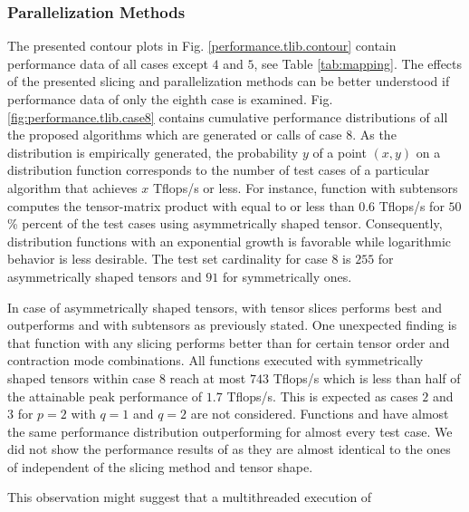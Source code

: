 \subsubsection{Parallelization Methods}
The presented contour plots in Fig. \ref{performance.tlib.contour} contain performance data of all cases except $4$ and $5$, see Table \ref{tab:mapping}.
The effects of the presented slicing and parallelization methods can be better understood if performance data of only the eighth case is examined.
Fig. \ref{fig:performance.tlib.case8} contains cumulative performance distributions of all the proposed algorithms which are generated  or  calls of case 8.
As the distribution is empirically generated, the probability $y$ of a point $(x,y)$ on a distribution function corresponds to the number of test cases of a particular algorithm that achieves $x$ Tflops/s or less.
For instance, function  with subtensors computes the tensor-matrix product with equal to or less than 0.6 Tflops/s for $50$\% percent of the test cases using asymmetrically shaped tensor.
Consequently, distribution functions with an exponential growth is favorable while logarithmic behavior is less desirable.
The test set cardinality for case 8 is $255$ for asymmetrically shaped tensors and $91$ for symmetrically ones.

In case of asymmetrically shaped tensors,  with tensor slices performs best and outperforms  and  with subtensors as previously stated.
One unexpected finding is that function  with any slicing performs better than  for certain tensor order and contraction mode combinations.
All functions executed with symmetrically shaped tensors within case 8 reach at most $743$ Tflops/s which is less than half of the attainable peak performance of $1.7$ Tflops/s.
This is expected as cases $2$ and $3$ for $p=2$ with $q=1$ and $q=2$ are not considered.
Functions  and  have almost the same performance distribution outperforming  for almost every test case.
We did not show the performance results of  as they are almost identical to the ones of  independent of the slicing method and tensor shape.


This observation might suggest that a multithreaded execution of  

\vspace{-1.5em}


